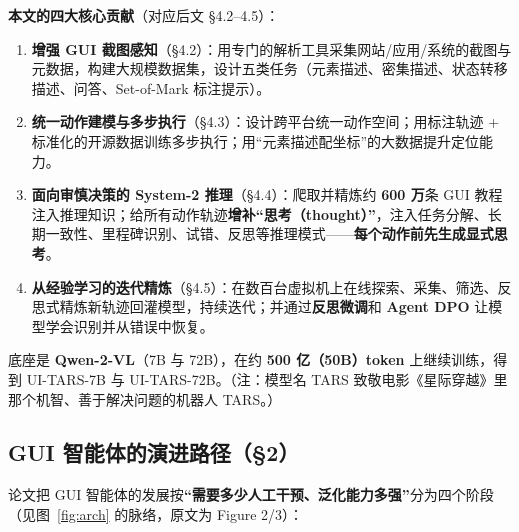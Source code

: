 \documentclass[11pt,UTF8,fontset=fandol]{ctexart}
\begin{document}
\textbf{本文的四大核心贡献}（对应后文 §4.2--4.5）：
\begin{enumerate}[leftmargin=1.6em]
\item \textbf{增强 GUI 截图感知}（§4.2）：用专门的解析工具采集网站/应用/系统的截图与元数据，构建大规模数据集，设计五类任务（元素描述、密集描述、状态转移描述、问答、Set-of-Mark 标注提示）。
\item \textbf{统一动作建模与多步执行}（§4.3）：设计跨平台统一动作空间；用标注轨迹 + 标准化的开源数据训练多步执行；用“元素描述配坐标”的大数据提升定位能力。
\item \textbf{面向审慎决策的 System-2 推理}（§4.4）：爬取并精炼约 \textbf{600 万}条 GUI 教程注入推理知识；给所有动作轨迹\textbf{增补“思考（thought）”}，注入任务分解、长期一致性、里程碑识别、试错、反思等推理模式——\textbf{每个动作前先生成显式思考}。
\item \textbf{从经验学习的迭代精炼}（§4.5）：在数百台虚拟机上在线探索、采集、筛选、反思式精炼新轨迹回灌模型，持续迭代；并通过\textbf{反思微调}和 \textbf{Agent DPO} 让模型学会识别并从错误中恢复。
\end{enumerate}

底座是 \textbf{Qwen-2-VL}（7B 与 72B），在约 \textbf{500 亿（50B）token} 上继续训练，得到 UI-TARS-7B 与 UI-TARS-72B。（注：模型名 TARS 致敬电影《星际穿越》里那个机智、善于解决问题的机器人 TARS。）

\subsection{GUI 智能体的演进路径（§2）}

论文把 GUI 智能体的发展按\textbf{“需要多少人工干预、泛化能力多强”}分为四个阶段（见图~\ref{fig:arch} 的脉络，原文为 Figure 2/3）：
\end{document}
